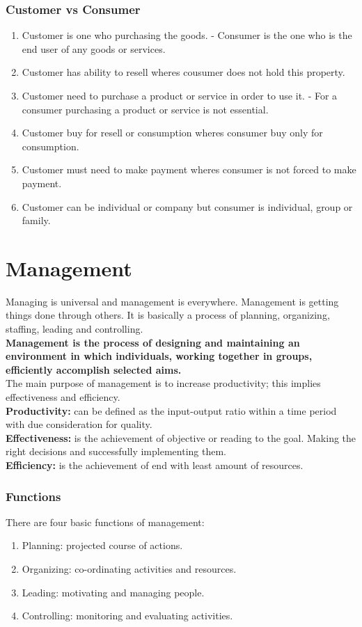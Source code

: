 \documentclass[11pt]{book}
\begin{document}
\section{Customer vs Consumer}
\begin{enumerate}
	\item Customer is one who purchasing the goods. - Consumer is the one who is the end user of any goods or services.
	\item Customer has ability to resell wheres cousumer does not hold this property.
	\item Customer need to purchase a product or service in order to use it. - For a consumer purchasing a product or service is not essential.
	\item Customer buy for resell or consumption wheres consumer buy only for consumption.
	\item Customer must need to make payment wheres consumer is not forced to make payment.
	\item Customer can be individual or company but consumer is individual, group or family.
\end{enumerate}

\part{Management}
Managing is universal and management is everywhere. Management is getting things done through others. It is basically a process of planning, organizing, staffing, leading and controlling. \\
\textbf{Management is the process of designing and maintaining an environment in which individuals, working together in groups, efficiently accomplish selected aims.} \\
The main purpose of management is to increase productivity; this implies effectiveness and efficiency. \\
\textbf{Productivity: } can be defined as the input-output ratio within a time period with due consideration for quality. \\
\textbf{Effectiveness: } is the achievement of objective or reading to the goal. Making the right decisions and successfully implementing them. \\
\textbf{Efficiency: } is the achievement of end with least amount of resources.

\section{Functions}
There are four basic functions of management:
\begin{enumerate}
	\item Planning: projected course of actions.
	\item Organizing: co-ordinating activities and resources.
	\item Leading: motivating and managing people.
	\item Controlling: monitoring and evaluating activities.
\end{enumerate}
\end{document}
